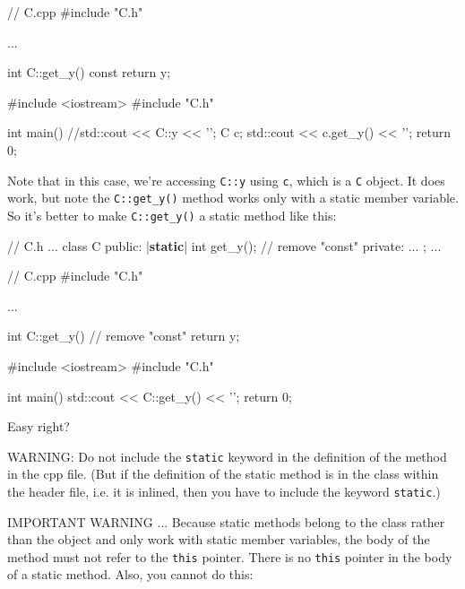 \begin{consolethree}[escapeinside=||]
// C.cpp
#include "C.h"

...

int C::get_y() const
{
    return y;
}
\end{consolethree}

\begin{consolethree}[escapeinside=||]
#include <iostream>
#include "C.h"

int main()
{
    //std::cout << C::y << '\n';
    C c;
    std::cout << c.get_y() << '\n';
    return 0;
}
\end{consolethree}

Note that in this case, we're accessing \texttt{C::y}
using \texttt{c}, which is a \texttt{C} object. It does work, but note the
\texttt{C::get\_y()} method works only with a static member variable. So
it's better to make \texttt{C::get\_y()} a static method
like this:

\begin{consolethree}[escapeinside=||]
// C.h
...
class C
{
public:
    |{\bf static}| int get_y(); // remove "const"
private:
    ...
};
...
\end{consolethree}

\begin{consolethree}[escapeinside=||]
// C.cpp
#include "C.h"

...

int C::get_y() // remove "const"
{
    return y;
}
\end{consolethree}

\begin{consolethree}[escapeinside=||]
#include <iostream>
#include "C.h"

int main()
{
    std::cout << C::get_y() << '\n';
    return 0;
}
\end{consolethree}

Easy right?

WARNING: Do not include the \texttt{static} keyword in the definition of
the method in the cpp file. (But if the definition of the static method
is in the class within the header file, i.e. it is inlined, then you
have to include the keyword \texttt{static}.)

IMPORTANT WARNING ... Because static methods belong to the class rather
than the object and only work with static member variables, the body of
the method must not refer to the \texttt{this} pointer. There is no
\texttt{this} pointer in the body of a static method. Also, you cannot do
this:

